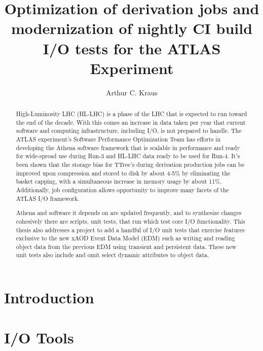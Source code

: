 \documentclass[12pt]{niuthesis}
\title{Optimization of derivation jobs and modernization of nightly CI build I/O tests for the ATLAS Experiment}
\author{Arthur C. Kraus}
\begin{document}
\begin{abstract}
High-Luminosity LHC (HL-LHC) is a phase of the LHC that is expected to run toward the end of the decade. With this comes an increase in data taken per year that current software and computing infrastructure, including I/O, is not prepared to handle. 
The ATLAS experiment's Software Performance Optimization Team has efforts in developing the Athena software framework that is scalable in performance and ready for wide-spread use during Run-3 and HL-LHC data ready to be used for Run-4. 
It's been shown that the storage bias for TTree's during derivation production jobs can be improved upon compression and stored to disk by about 4-5\% by eliminating the basket capping, with a simultaneous increase in memory usage by about 11\%. 
Additionally, job configuration allows opportunity to improve many facets of the ATLAS I/O framework.

Athena and software it depends on are updated frequently, and to synthesize changes cohesively there are scripts, unit tests, that run which test core I/O functionality. 
This thesis also addresses a project to add a handful of I/O unit tests that exercise features exclusive to the new xAOD Event Data Model (EDM) such as writing and reading object data from the previous EDM using transient and persistent data. 
These new unit tests also include and omit select dynamic attributes to object data. 
\end{abstract}

\begin{dedication}

\end{dedication}

\begin{acknowledgements}

\end{acknowledgements}
\MakeThesisPrologue




\chapter{Introduction}
\label{chap:Intro}


\chapter{I/O Tools}
\label{chap:IO_Tools}

\end{document}
